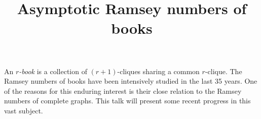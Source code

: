 \title{Asymptotic Ramsey numbers of books}
\endtitle

An \emph{$r$-book} is a collection of $(r+1)$-cliques sharing a common $r$-clique. The Ramsey numbers of books have been intensively studied in the last 35 years. One of the reasons for this enduring interest is their close relation to the Ramsey numbers of complete graphs. This talk will present some recent progress in this vast subject.    